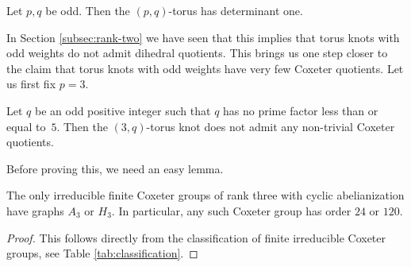 \documentclass[main.tex]{subfiles}
\begin{document}
\begin{corollary}
Let $p, q$ be odd. Then the $(p, q)$-torus has determinant one.
\end{corollary}

In Section \ref{subsec:rank-two} we have seen that this implies that torus knots with odd weights do not admit dihedral quotients. This brings us one step closer to the claim that torus knots with odd weights have very few Coxeter quotients. Let us first fix $p = 3$.

\begin{theorem}\label{thm:p=3}
Let $q$ be an odd positive integer such that $q$ has no prime factor less than or equal to~$5$. Then the $(3, q)$-torus knot does not admit any non-trivial Coxeter quotients.
\end{theorem}

Before proving this, we need an easy lemma.

\begin{lemma}\label{lem:p=3}
The only irreducible finite Coxeter groups of rank three with cyclic abelianization have graphs $A_3$ or $H_3$. In particular, any such Coxeter group has order $24$ or $120$.
\end{lemma}

\begin{proof}
This follows directly from the classification of finite irreducible Coxeter groups, see Table \ref{tab:classification}.
\end{proof}
\end{document}
